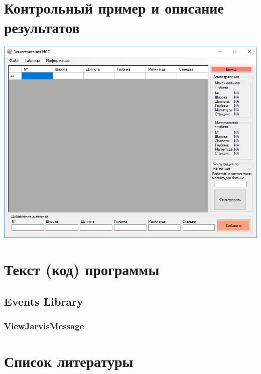 \documentclass[a4paper,12pt, fleqn]{article}
\theoremstyle{plain} %
\theoremstyle{definition} %
\theoremstyle{remark} %
\numberwithin{equation}{section}
\begin{document}
\section{Контрольный пример и описание результатов}
\includegraphics[width=1\linewidth]{q1.png}


\section{Текст (код) программы}
\subsection{Events Library}
\subsubsection{ViewJarvisMessage}
%
%
%
%
%

\newpage

\section{Список литературы}



\end{document}
